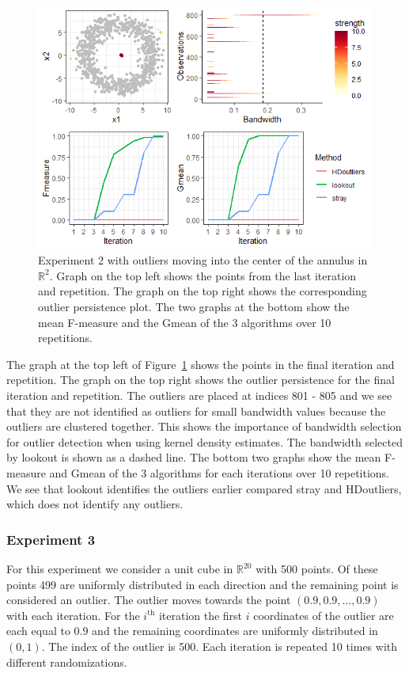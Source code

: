\documentclass[letter,12pt]{article}
\begin{document}
\begin{figure}[!ht]
    \centering
    \includegraphics[scale=0.8]{Graphics/Comparison_Ex2.png}
    \caption{Experiment 2 with outliers moving into the center of the annulus in $\mathbb{R}^2$. Graph on the top left shows the points from the last iteration and repetition. The graph on the top right shows the corresponding outlier persistence plot. The  two graphs at the bottom show the mean F-measure and the Gmean of the 3 algorithms over 10 repetitions. }
    \label{fig:ComparisonEx2}
\end{figure}

The graph at the top left of  Figure~\ref{fig:ComparisonEx2} shows the points in the final iteration and repetition. The graph on the top right shows the outlier persistence for the final iteration and repetition. The outliers are placed at indices 801 - 805 and we see that they are not identified as outliers for small bandwidth values because the outliers are clustered together. This shows the importance of bandwidth selection for outlier detection when using kernel density estimates. The bandwidth selected by lookout is shown as a dashed line.  The bottom two graphs show the mean F-measure and Gmean of the 3 algorithms for each iterations over 10 repetitions. We see that lookout identifies the outliers earlier compared stray and HDoutliers, which does not identify any outliers. 

\subsubsection{Experiment 3}\label{sec:exp3}
For this experiment we consider a unit cube in $\mathbb{R}^{20}$ with 500 points. Of these points 499 are uniformly distributed in each direction and the remaining point is considered an outlier. The outlier moves towards the point $\left( 0.9, 0.9, \ldots, 0.9 \right)$ with each iteration. For the $i^{\text{th}}$ iteration the first $i$ coordinates of the outlier are each equal to $0.9$ and the remaining coordinates are uniformly distributed in $(0,1)$. The index of the outlier is 500. Each iteration is repeated 10 times with different randomizations. 
\end{document}
